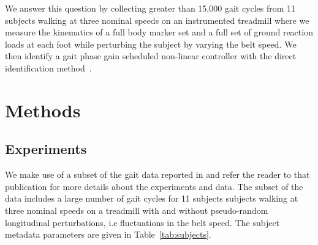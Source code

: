 \documentclass{article}
\begin{document}
We answer this question by collecting greater than 15,000 gait cycles from 11
subjects walking at three nominal speeds on an instrumented treadmill where we
measure the kinematics of a full body marker set and a full set of ground
reaction loads at each foot while perturbing the subject by varying the belt
speed. We then identify a gait phase gain scheduled non-linear controller with
the direct identification method~\cite{Ljung1999}.

\section*{Methods}
%
\subsection*{Experiments}
%
We make use of a subset of the gait data reported in \cite{Moore2015} and refer
the reader to that publication for more details about the experiments and data.
The subset of the data includes a large number of gait cycles for 11 subjects
subjects walking at three nominal speeds on a treadmill with and without
pseudo-random longitudinal perturbations, i.e fluctuations in the belt speed.
The subject metadata parameters are given in Table~\ref{tab:subjects}.
%
\begin{table}
  \cprotect\caption{Information about the 11 study participants. The final
    three columns provide the trial numbers associated with each nominal
    treadmill speed. The measured mass is computed from the mean total vertical
    ground reaction force just after the calibration pose event. Generated by
    \verb|src/subject_table.py|.}
  \centering
  
  \label{tab:subjects}
\end{table}
\end{document}
